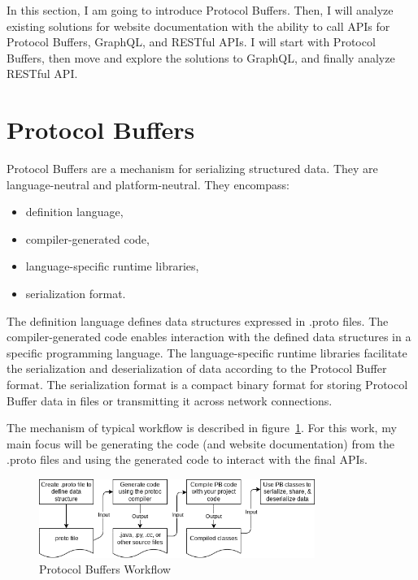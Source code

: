 In this section, I am going to introduce Protocol Buffers.
Then, I will analyze existing solutions for website documentation with the ability to call APIs for Protocol Buffers, GraphQL, and RESTful APIs.
I will start with Protocol Buffers, then move and explore the solutions to GraphQL, and finally analyze RESTful API\@.


\section{Protocol Buffers}
Protocol Buffers are a mechanism for serializing structured data.
They are language-neutral and platform-neutral.
They encompass:
\begin{itemize}
    \item definition language,
    \item compiler-generated code,
    \item language-specific runtime libraries,
    \item serialization format.
\end{itemize}
The definition language defines data structures expressed in .proto files.
The compiler-generated code enables interaction with the defined data structures in a specific programming language.
The language-specific runtime libraries facilitate the serialization and deserialization of data according to the Protocol Buffer format.
The serialization format is a compact binary format for storing Protocol Buffer data in files or transmitting it across network connections.
\cite{protobuf-overview}

The mechanism of typical workflow is described in figure~\ref{fig:protobuf-mechanism}.
For this work, my main focus will be generating the code (and website documentation) from the .proto files and using the generated code to interact with the final APIs.
\begin{figure}[hbt!]
    \centering
    \captionsetup{justification=centering}
    \includegraphics[width=0.8\textwidth]{images/protocol-buffers-concepts.png}
    \caption{Protocol Buffers Workflow~\cite{protobuf-overview}}
    \label{fig:protobuf-mechanism}
\end{figure}

